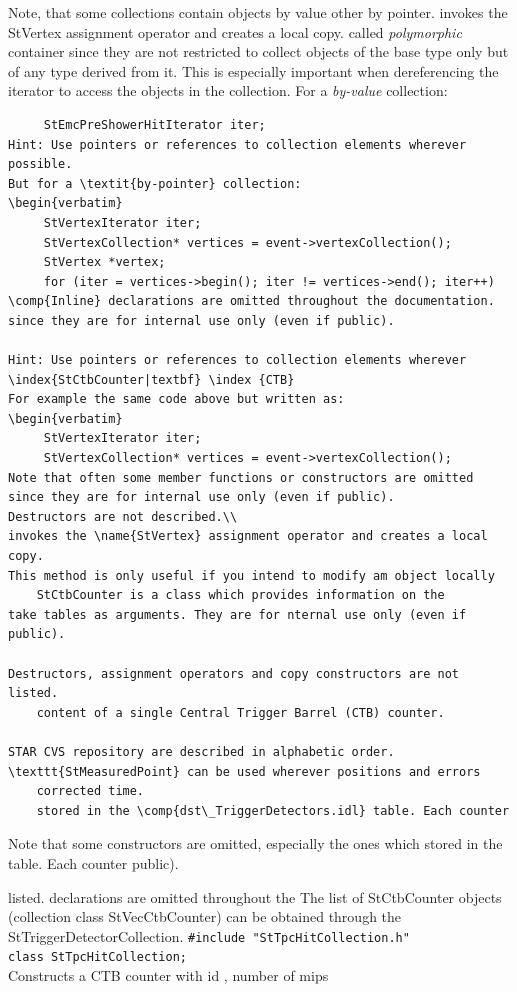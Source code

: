 Note, that some collections contain objects by value other by pointer.
invokes the StVertex assignment operator and creates a local copy.
called \textit{polymorphic} container since they are not restricted to
collect objects of the base type only but of any type derived from
it. This is especially important when dereferencing the iterator to
access the objects in the collection.  For a \textit{by-value}
collection:
\begin{verbatim}
     StEmcPreShowerHitIterator iter;
Hint: Use pointers or references to collection elements wherever possible.
But for a \textit{by-pointer} collection:
\begin{verbatim}
     StVertexIterator iter;
     StVertexCollection* vertices = event->vertexCollection();
     StVertex *vertex;
     for (iter = vertices->begin(); iter != vertices->end(); iter++)
\comp{Inline} declarations are omitted throughout the documentation.
since they are for internal use only (even if public). 

Hint: Use pointers or references to collection elements wherever
\index{StCtbCounter|textbf} \index {CTB}
For example the same code above but written as:
\begin{verbatim}
     StVertexIterator iter;
     StVertexCollection* vertices = event->vertexCollection();
Note that often some member functions or constructors are omitted
since they are for internal use only (even if public).
Destructors are not described.\\
invokes the \name{StVertex} assignment operator and creates a local copy.
This method is only useful if you intend to modify am object locally
    StCtbCounter is a class which provides information on the
take tables as arguments. They are for nternal use only (even if public).

Destructors, assignment operators and copy constructors are not listed.
    content of a single Central Trigger Barrel (CTB) counter.  
    
STAR CVS repository are described in alphabetic order.
\texttt{StMeasuredPoint} can be used wherever positions and errors
    corrected time.
    stored in the \comp{dst\_TriggerDetectors.idl} table. Each counter
\end{verbatim}
Note that some constructors are omitted, especially the ones which
    stored in the  table. Each counter
public).

    
listed.   declarations are omitted throughout the
    The list of StCtbCounter objects (collection class StVecCtbCounter) can be obtained
    through the StTriggerDetectorCollection.
    \verb+#include "StTpcHitCollection.h"+\\
    \verb+class StTpcHitCollection;+\\
    Constructs a CTB counter with id , number of mips 
%
   
